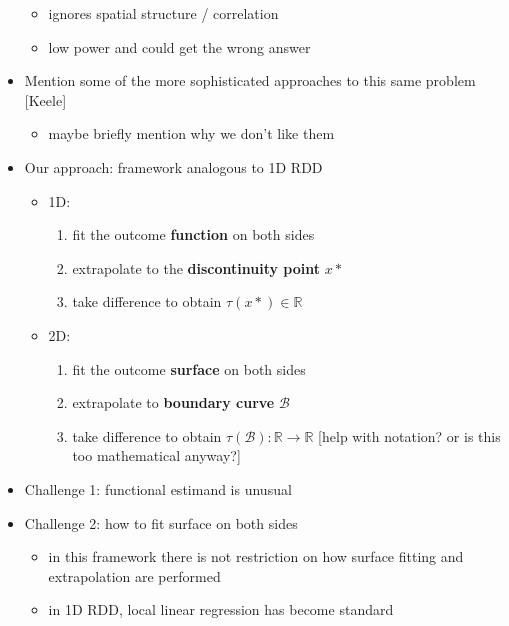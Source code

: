 \documentclass[letter]{article}
\providecommand{\tightlist}{%
      \setlength{\itemsep}{0pt}\setlength{\parskip}{0pt}}
\newcommand{\boundary}{\mathcal{B}}
\providecommand{\tightlist}{%
  	  \setlength{\itemsep}{0pt}\setlength{\parskip}{0pt}}
\begin{document}
\begin{itemize}
  \begin{itemize}
  \tightlist
  \item
    ignores spatial structure / correlation
  \item
    low power and could get the wrong answer
  \end{itemize}
\item
  Mention some of the more sophisticated approaches to this same problem {[}Keele{]}

  \begin{itemize}
  \tightlist
  \item
    maybe briefly mention why we don't like them
  \end{itemize}
\item
  Our approach: framework analogous to 1D RDD

  \begin{itemize}
  \tightlist
  \item
    1D:

    \begin{enumerate}
    \def\labelenumi{\arabic{enumi}.}
    \tightlist
    \item
      fit the outcome \textbf{function} on both sides
    \item
      extrapolate to the \textbf{discontinuity point} \(x*\)
    \item
      take difference to obtain \(\tau(x*) \in \mathbb{R}\)
    \end{enumerate}
  \item
    2D:

    \begin{enumerate}
    \def\labelenumi{\arabic{enumi}.}
    \tightlist
    \item
      fit the outcome \textbf{surface} on both sides
    \item
      extrapolate to \textbf{boundary curve} \(\boundary\)
    \item
      take difference to obtain \(\tau(\boundary): \mathbb{R} \rightarrow \mathbb{R}\) {[}help with notation? or is this too mathematical anyway?{]}
    \end{enumerate}
  \end{itemize}
\item
  Challenge 1: functional estimand is unusual
\item
  Challenge 2: how to fit surface on both sides

  \begin{itemize}
  \tightlist
  \item
    in this framework there is not restriction on how surface fitting and extrapolation are performed
  \item
    in 1D RDD, local linear regression has become standard


\end{itemize}
\end{itemize}
\end{document}
